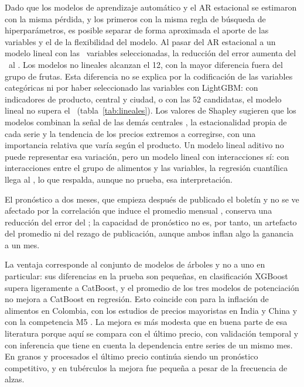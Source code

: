 Dado que los modelos de aprendizaje automático y el AR estacional se estimaron con la misma pérdida, y los primeros con la misma regla de búsqueda de hiperparámetros, es posible separar de forma aproximada el aporte de las variables y el de la flexibilidad del modelo. Al pasar del AR estacional a un modelo lineal con las \cnfinal\ variables seleccionadas, la reducción del error aumenta del \cmejar\pct\ al \cmejlin\pct. Los modelos no lineales alcanzan el 12\pct, con la mayor diferencia fuera del grupo de frutas. Esta diferencia no se explica por la codificación de las variables categóricas ni por haber seleccionado las variables con LightGBM: con indicadores de producto, central y ciudad, o con las 52 candidatas, el modelo lineal no supera el \cmejlin\pct\ (tabla~\ref{tab:lineales}). Los valores de Shapley sugieren que los modelos combinan la señal de las demás centrales \citep{gafaro2020}, la estacionalidad propia de cada serie y la tendencia de los precios extremos a corregirse, con una importancia relativa que varía según el producto. Un modelo lineal aditivo no puede representar esa variación, pero un modelo lineal con interacciones sí: con interacciones entre el grupo de alimentos y las variables, la regresión cuantílica llega al \rvlininter\pct, lo que respalda, aunque no prueba, esa interpretación.

El pronóstico a dos meses, que empieza después de publicado el boletín y no se ve afectado por la correlación que induce el promedio mensual \citep{working1960}, conserva una reducción del error del \rvhdosred\pct; la capacidad de pronóstico no es, por tanto, un artefacto del promedio ni del rezago de publicación, aunque ambos inflan algo la ganancia a un mes.

La ventaja corresponde al conjunto de modelos de árboles y no a uno en particular: sus diferencias en la prueba son pequeñas, en clasificación XGBoost supera ligeramente a CatBoost, y el promedio de los tres modelos de potenciación no mejora a CatBoost en regresión. Esto coincide con \citet{anzola2025} para la inflación de alimentos en Colombia, con los estudios de precios mayoristas en India y China \citep{paul2022,zhang2024} y con la competencia M5 \citep{m5,januschowski2022}. La mejora es más modesta que en buena parte de esa literatura porque aquí se compara con el último precio, con validación temporal y con inferencia que tiene en cuenta la dependencia entre series de un mismo mes. En granos y procesados el último precio continúa siendo un pronóstico competitivo, y en tubérculos la mejora fue pequeña a pesar de la frecuencia de alzas.

